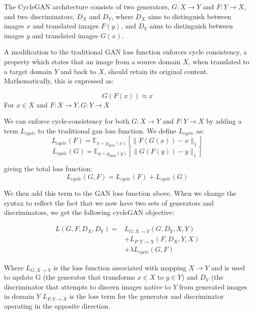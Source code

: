 \documentclass[12pt]{article}
\begin{document}
The CycleGAN architecture consists of two generators, \(G: X \rightarrow Y\) and \(F: Y \rightarrow X\), and two discriminators, \(D_X\) and \(D_Y\), where \(D_X\) aims to distinguish between images \(x\) and translated images \(F(y)\), and \(D_Y\) aims to distinguish between images \(y\) and translated images \(G(x)\). 



A modification to the traditional GAN loss function enforces cycle consistency, a property which states that an image from a source domain \(X\), when translated to a target domain \(Y\) and back to \(X\), should retain its original content. Mathematically, this is expressed as:

\begin{equation}
G(F(x)) \approx x
\end{equation}
For \(x \in X\) and \(F: X \rightarrow Y, G: Y\rightarrow X\)

We can enforce cycle-consistency for both \(G: X \rightarrow Y\) and \(F: Y \rightarrow X\) by adding a term \(L_{cycle}\) to the traditional gan loss function. We define \(L_{cycle}\) as:
\[L_{cycle}(F) = \mathbb{E}_{x \sim p_{data}(x)}[\|F(G(x)) - x\|_1]\]
\[L_{cycle}(G) = \mathbb{E}_{y \sim p_{data}(y)}[\|G(F(y)) - y\|_1]\]

giving the total loss function:
\begin{equation}
L_{cycle}(G, F) = L_{cycle}(F) + L_{cycle}(G)
\end{equation}

We then add this term to the GAN loss function above. When we change the syntax to reflect the fact that we now have two sets of generators and discriminators, we get the following cycleGAN objective:

\begin{align}
    L(G, F, D_X, D_Y) = &L_{G: X \rightarrow Y}(G, D_Y, X, Y) \nonumber \\
    &+ L_{F: Y \rightarrow X}(F, D_X, Y, X) \nonumber \\
    &+ \lambda L_{cycle}(G, F)
\end{align}

Where \(L_{G: X \rightarrow Y}\) is the loss function associated with mapping \(X \rightarrow Y \) and is used to update G (the generator that transforms \( x \in X\) to \(y \in Y\)) and \(D_Y\) (the discriminator that attempts to discern images native to \(Y\) from generated images in domain \(Y\) \(L_{F: Y \rightarrow X}\) is the loss term for the generator and discriminator operating in the opposite direction. 
\end{document}
